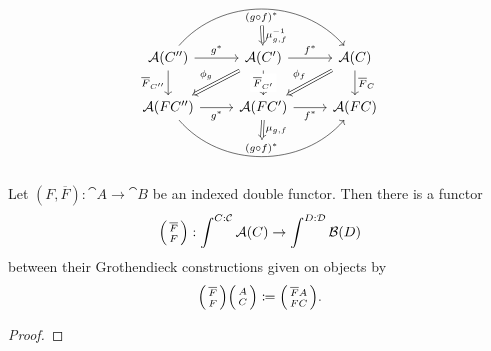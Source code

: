 \documentclass[DynamicalBook]{subfiles}
\begin{document}
\begin{definition}
\begin{itemize}
\[\begin{tikzcd}
\cat{A}(C'') \arrow[d, "\overline{F}_{C''}"'] \arrow[r, "g^\ast"] \arrow[rr, "(g
\circ f)^\ast"{name=Top, below}, bend left=49] \ar[r, Rightarrow, from=Top,
"\mu_{g, f}\inv"] & \cat{A}(C')  \arrow[r, "f^\ast"] \arrow[d, "\overline{F}_{C'}" description] \arrow[ld, "\phi_g"', Rightarrow] & \cat{A}(C) \arrow[d, "\overline{F}_C"] \arrow[ld, "\phi_f"', Rightarrow] \\
\cat{A}(FC'') \arrow[r, "g^{\ast}"'] \arrow[rr, "(g \circ
f)^{\ast}"'{name=Bottom, above}, bend right=49]                          &
\cat{A}(FC') \arrow[Rightarrow, to=Bottom, "\mu_{g, f}"] \arrow[r, "f^{\ast}"']                                                                          & \cat{A}(FC)                                                             
\end{tikzcd}
    \]
  \end{itemize}
\end{definition}

\begin{proposition}\label{prop.groth_construction_functoriality}
  Let $(F, \overline{F}) : \cat{A} \to \cat{B}$ be an indexed double functor.
  Then there is a functor
  $$\lens{\overline{F}}{F} : \int^{C : \cat{C}} \cat{A}(C) \to \int^{D :
    \cat{D}} \cat{B}(D)$$
  between their Grothendieck constructions given on objects by
  $$\lens{\overline{F}}{F} \lens{A}{C} \coloneqq \lens{\overline{F}A}{FC}.$$
\end{proposition}
\begin{proof}

\end{proof}
\end{document}
